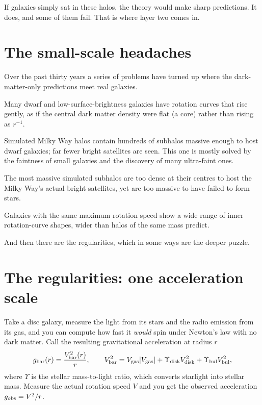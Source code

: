 If galaxies simply sat in these halos, the theory would make sharp predictions. It does, and some of them fail. That is where layer two comes in.

\section{The small-scale headaches}

Over the past thirty years a series of problems have turned up where the dark-matter-only predictions meet real galaxies.

\begin{description}[leftmargin=1em,style=nextline]
\item[Cusp versus core.] Many dwarf and low-surface-brightness galaxies have rotation curves that rise gently, as if the central dark matter density were flat (a core) rather than rising as $r^{-1}$.
\item[Missing satellites.] Simulated Milky Way halos contain hundreds of subhalos massive enough to host dwarf galaxies; far fewer bright satellites are seen. This one is mostly solved by the faintness of small galaxies and the discovery of many ultra-faint ones.
\item[Too big to fail.] The most massive simulated subhalos are too dense at their centres to host the Milky Way's actual bright satellites, yet are too massive to have failed to form stars.
\item[Diversity.] Galaxies with the same maximum rotation speed show a wide range of inner rotation-curve shapes, wider than halos of the same mass predict.
\end{description}

And then there are the regularities, which in some ways are the deeper puzzle.

\section{The regularities: one acceleration scale}

Take a disc galaxy, measure the light from its stars and the radio emission from its gas, and you can compute how fast it \emph{would} spin under Newton's law with no dark matter. Call the resulting gravitational acceleration at radius $r$
\begin{equation}
g_{\rm bar}(r)=\frac{V_{\rm bar}^2(r)}{r},\qquad V_{\rm bar}^2=V_{\rm gas}|V_{\rm gas}|+\Upsilon_{\rm disk}V_{\rm disk}^2+\Upsilon_{\rm bul}V_{\rm bul}^2,
\end{equation}
where $\Upsilon$ is the stellar mass-to-light ratio, which converts starlight into stellar mass. Measure the actual rotation speed $V$ and you get the observed acceleration $g_{\rm obs}=V^2/r$.

